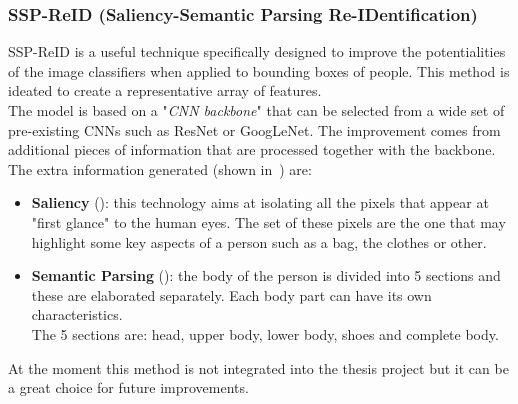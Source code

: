\subsubsection*{SSP-ReID (Saliency-Semantic Parsing Re-IDentification)}
SSP-ReID\cite{ssp_reID} is a useful technique specifically designed to improve the potentialities of the image classifiers when applied to bounding boxes of people. This method is ideated to create a representative array of features.\\
The model is based on a "\textit{CNN backbone}" that can be selected from a wide set of pre-existing CNNs such as ResNet or GoogLeNet. The improvement comes from additional pieces of information that are processed together with the backbone.\\
The extra information generated (shown in~) are:
\begin{itemize}
	\item \textbf{Saliency} (): this technology aims at isolating all the pixels that appear at "first glance" to the human eyes. The set of these pixels are the one that may highlight some key aspects of a person such as a bag, the clothes or other.
	\item \textbf{Semantic Parsing} (): the body of the person is divided into 5 sections and these are elaborated separately. Each body part can have its own characteristics.\\
	The 5 sections are: head, upper body, lower body, shoes and complete body.
\end{itemize}
At the moment this method is not integrated into the thesis project but it can be a great choice for future improvements.


